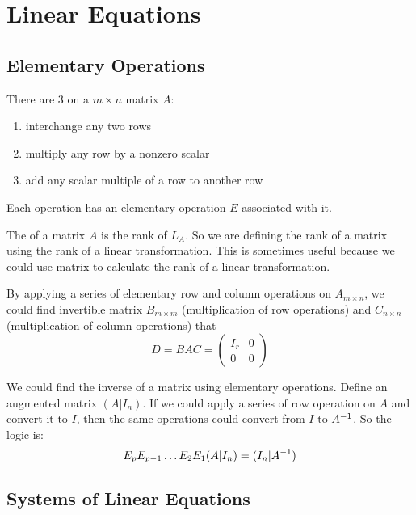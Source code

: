 \chapter{Linear Equations}

\section{Elementary Operations}

There are 3  on a $m \times n$ matrix $A$:
\begin{enumerate}
    \item interchange any two rows
    \item multiply any row by a nonzero scalar
    \item add any scalar multiple of a row to another row
\end{enumerate}

Each operation has an elementary operation $E$ associated with it.


The  of a matrix $A$ is the rank of $L_A$. So we are defining the rank of a matrix using the rank of a linear transformation. This is sometimes useful because we could use matrix to calculate the rank of a linear transformation.

By applying a series of elementary row and column operations on $A_{m \times n}$, we could find invertible matrix $B_{m \times m}$ (multiplication of row operations) and $C_{n \times n}$ (multiplication of column operations) that
\begin{equation*}
    D = B A C = \begin{pmatrix}
        I_r & 0 \\
        0 & 0
    \end{pmatrix}
\end{equation*}

We could find the inverse of a matrix using elementary operations. Define an augmented matrix $(A|I_n)$. If we could apply a series of row operation on $A$ and convert it to $I$, then the same operations could convert from $I$ to ${A}^{-1}$. So the logic is:
\begin{equation}
    E_p E_{p-1} \hdots E_2 E_1 (A|I_n) = (I_n | {A}^{-1} )
\end{equation}


\section{Systems of Linear Equations}


